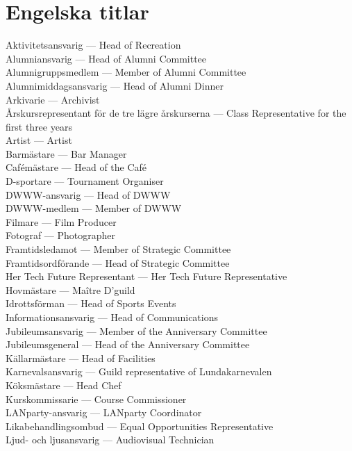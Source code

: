 \documentclass{dsekprotokoll}
\begin{document}
\section{Engelska titlar}
Aktivitetsansvarig ---	Head of Recreation \\
Alumniansvarig ---	Head of Alumni Committee\\
Alumnigruppsmedlem ---	Member of Alumni Committee\\
Alumnimiddagsansvarig ---	Head of Alumni Dinner\\
Arkivarie ---	Archivist\\
Årskursrepresentant för de tre lägre årskurserna ---	Class Representative for the first three years\\
Artist ---	Artist\\
Barmästare ---	Bar Manager\\
Cafémästare ---	Head of the Café\\
D-sportare --- Tournament Organiser \\
DWWW-ansvarig ---	Head of DWWW\\
DWWW-medlem ---	Member of DWWW\\
Filmare --- Film Producer \\
Fotograf ---	Photographer\\
Framtidsledamot ---	Member of Strategic Committee\\
Framtidsordförande ---	Head of Strategic Committee\\
Her Tech Future Representant ---	Her Tech Future Representative\\
Hovmästare ---	Maître D'guild\\
Idrottsförman ---	Head of Sports Events\\
Informationsansvarig ---	Head of Communications\\
Jubileumsansvarig ---	Member of the Anniversary Committee\\
Jubileumsgeneral ---	Head of the Anniversary Committee\\
Källarmästare ---	Head of Facilities\\
Karnevalsansvarig ---	Guild representative of Lundakarnevalen\\
Köksmästare ---	Head Chef\\
Kurskommissarie ---	Course Commissioner\\
LANparty-ansvarig ---	LANparty Coordinator\\
Likabehandlingsombud ---	Equal Opportunities Representative\\
Ljud- och ljusansvarig ---	Audiovisual Technician\\
\end{document}
